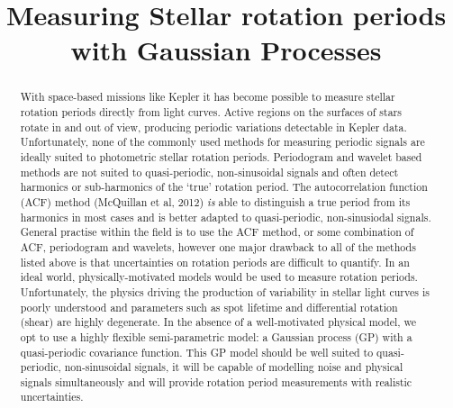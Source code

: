 \documentclass[10pt,preprint]{aastex}
\begin{document}
\title{Measuring Stellar rotation periods with Gaussian Processes}

\begin{abstract}

With space-based missions like Kepler it has become possible to measure
stellar rotation periods directly from light curves.
Active regions on the surfaces of stars rotate in and out of view, producing
periodic variations detectable in Kepler data.
Unfortunately, none of the commonly used methods for measuring periodic
signals are ideally suited to photometric stellar rotation periods.
Periodogram and wavelet based methods are not suited to quasi-periodic,
non-sinusoidal signals and often detect harmonics or sub-harmonics of the
`true' rotation period.
The autocorrelation function (ACF) method (McQuillan et al, 2012) \emph{is}
able to distinguish a true period from its harmonics in most cases and is
better adapted to quasi-periodic, non-sinusiodal signals.
General practise within the field is to use the ACF method, or some
combination of ACF, periodogram and wavelets, however one major drawback to
all of the methods listed above is that uncertainties on rotation periods are
difficult to quantify.
In an ideal world, physically-motivated models would be used to measure
rotation periods.
Unfortunately, the physics driving the production of variability in stellar
light curves is poorly understood and parameters such as spot lifetime and
differential rotation (shear) are highly degenerate.
In the absence of a well-motivated physical model, we opt to use a highly
flexible semi-parametric model: a Gaussian process (GP) with a quasi-periodic
covariance function.
This GP model should be well suited to quasi-periodic, non-sinusoidal signals,
it will be capable of  modelling noise and physical signals simultaneously and
will provide rotation period measurements with realistic uncertainties.


\end{abstract}
\end{document}
